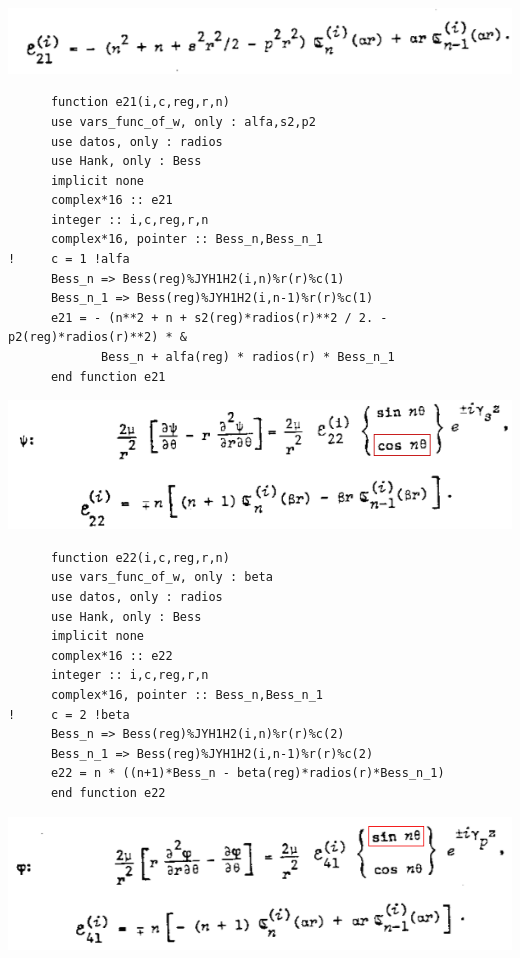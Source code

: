 \documentclass [11pt,spanish]{article}
\begin{document}
\includegraphics[scale=0.5]{e21b}
\begingroup
\fontsize{10pt}{12pt}
\selectfont
{}
\begin{shaded}
\begin{verbatim}
      function e21(i,c,reg,r,n)
      use vars_func_of_w, only : alfa,s2,p2
      use datos, only : radios
      use Hank, only : Bess
      implicit none
      complex*16 :: e21
      integer :: i,c,reg,r,n
      complex*16, pointer :: Bess_n,Bess_n_1
!     c = 1 !alfa
      Bess_n => Bess(reg)%JYH1H2(i,n)%r(r)%c(1)
      Bess_n_1 => Bess(reg)%JYH1H2(i,n-1)%r(r)%c(1)
      e21 = - (n**2 + n + s2(reg)*radios(r)**2 / 2. - p2(reg)*radios(r)**2) * &
             Bess_n + alfa(reg) * radios(r) * Bess_n_1
      end function e21
\end{verbatim}
\end{shaded}
\endgroup
\includegraphics[scale=0.5]{e22}
\begingroup
\fontsize{10pt}{12pt}
\selectfont
{}
\begin{shaded}
\begin{verbatim}
      function e22(i,c,reg,r,n)
      use vars_func_of_w, only : beta
      use datos, only : radios
      use Hank, only : Bess
      implicit none
      complex*16 :: e22
      integer :: i,c,reg,r,n
      complex*16, pointer :: Bess_n,Bess_n_1
!     c = 2 !beta
      Bess_n => Bess(reg)%JYH1H2(i,n)%r(r)%c(2)
      Bess_n_1 => Bess(reg)%JYH1H2(i,n-1)%r(r)%c(2)
      e22 = n * ((n+1)*Bess_n - beta(reg)*radios(r)*Bess_n_1)
      end function e22
\end{verbatim}
\end{shaded}
\endgroup
\includegraphics[scale=0.5]{e41}
\end{document}
